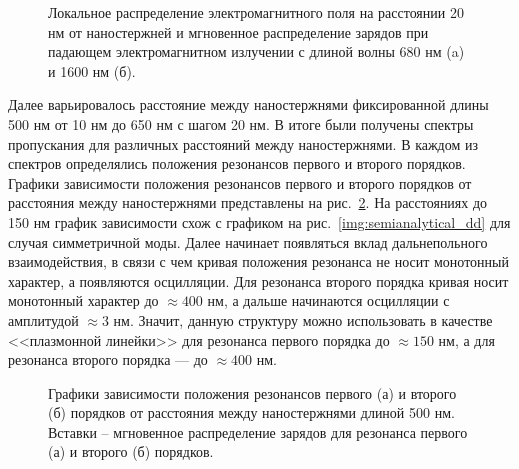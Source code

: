 \begin{figure}
\caption{Локальное распределение электромагнитного поля на расстоянии 20 нм от наностержней и мгновенное распределение зарядов при падающем электромагнитном излучении с длиной волны 680 нм (a) и 1600 нм (б).}
\label{img:locala500d100FDTD}
\end{figure}

Далее варьировалось расстояние между наностержнями фиксированной длины 500 нм от 10 нм до 650 нм с шагом 20 нм. В итоге были получены спектры пропускания для различных расстояний между наностержнями. В каждом из спектров определялись положения резонансов первого и второго порядков. Графики зависимости положения резонансов первого и второго порядков от расстояния между наностержнями представлены на рис.~\ref{img:a500PML}. На расстояниях до 150 нм график зависимости схож с графиком на рис.~\ref{img:semianalytical_dd} для случая симметричной моды. Далее начинает появляться вклад дальнепольного взаимодействия, в связи с чем кривая положения резонанса не носит монотонный характер, а появляются осцилляции. Для резонанса второго порядка кривая носит монотонный характер до $ \approx 400 $ нм, а дальше начинаются осцилляции с амплитудой $ \approx 3 $ нм. Значит, данную структуру можно использовать в качестве <<плазмонной линейки>> для резонанса первого порядка до $ \approx 150 $ нм, а для резонанса второго порядка --- до $ \approx 400 $ нм.

\begin{figure}
\caption{Графики зависимости положения  резонансов первого (а) и второго (б) порядков от расстояния между наностержнями длиной 500 нм. Вставки -- мгновенное распределение зарядов для резонанса первого (а) и второго (б) порядков.}
\label{img:a500PML}
\end{figure}

